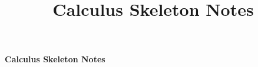 \documentclass[11pt,openany]{book}
\title{Calculus Skeleton Notes}
\begin{document}
\frontmatter
\begin{titlepage}
\centering
\vspace*{\fill}
{\LARGE\bfseries Calculus Skeleton Notes\par}
\vspace*{\fill}
\end{titlepage}
\tableofcontents

\mainmatter
\pagestyle{plain}
\makeatletter
\let\daymaketitle\maketitle
\renewcommand{\maketitle}{%
  \clearpage
  \phantomsection
  \addcontentsline{toc}{chapter}{\daydate: \@title}%
  \daymaketitle}
\makeatother
\newcommand{\includeday}[2]{%
  \begingroup
  \def\daydate{#1}%
  \clearpage
  \endgroup}

\includeday{September 9}{days/Sept-9-Intro}
\includeday{September 11}{days/Sept-11-Limits}
\end{document}
